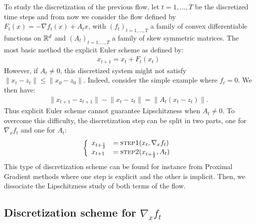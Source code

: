 To study the discretization of  the previous flow, let $t=1,\dots,T$ be the discretized time steps and from now we consider the flow defined by  $F_t(x) = -\nabla f_{t}(x)+A_t x$, with $(f_{t})_{t=1,\dots,T}$  a family of convex differentiable functions on $\mathbb{R}^d$ and $(A_t)_{t=1,\dots,T}$ a family of skew symmetric matrices. The most basic method the explicit Euler scheme as defined by: 
\begin{align*}
x_{t+1} = x_t+ F_t(x_t)
\end{align*}
However, if $A_t\neq 0$, this discretized system might not satisfy $\lVert x_t-z_t\rVert\leq\lVert x_0-z_0\rVert$. Indeed, consider the simple example where $f_t=0$. We then have:
\begin{align*}
\lVert x_{t+1}-z_{t+1}\rVert - \lVert x_{t}-z_{t}\rVert =\lVert A_t\left(x_{t}-z_{t}\right)\rVert.
\end{align*}
Thus explicit Euler scheme cannot guarantee Lipschitzness when $A_t\neq 0$. To overcome this difficulty, the discretization step can be split in two parts, one for $\nabla_x f_t$ and one for $A_t$: 
\begin{align*}
   \left\{
    \begin{array}{ll}
        x_{t+\frac12} &= \textsc{step1}(x_t, \nabla_x f_t)\\
        x_{t+1}& = \textsc{step2}(x_{t+\frac12}, A_t)
    \end{array} 
    \right.
\end{align*}
This type of discretization scheme  can be found for instance from Proximal Gradient methods where one step is explicit and the other is implicit. Then, we dissociate the Lipschitzness study of both terms of the flow. 

\subsection{Discretization scheme for $\nabla_x f_t$}


